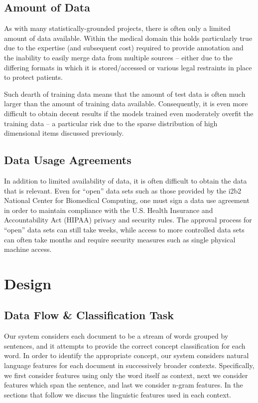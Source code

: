 \documentclass[preprint]{style}
\begin{document}
\subsection{Amount of Data}
As with many statistically-grounded projects, there is often only a limited amount of data available. Within the medical domain this holds particularly true due to the expertise (and subsequent cost) required to provide annotation and the inability to easily merge data from multiple sources -- either due to the differing formats in which it is stored/accessed or various legal restraints in place to protect patients.

Such dearth of training data means that the amount of test data is often much larger than the amount of training data available. Consequently, it is even more difficult to obtain decent results if the models trained even moderately overfit the training data -- a particular risk due to the sparse distribution of high dimensional items discussed previously.

\subsection{Data Usage Agreements}
In addition to limited availability of data, it is often difficult to obtain the data that is relevant. Even for ``open'' data sets such as those provided by the i2b2 National Center for Biomedical Computing, one must sign a data use agreement in order to maintain compliance with the U.S. Health Insurance and Accountability Act (HIPAA) privacy and security rules. The approval process for ``open'' data sets can still take weeks, while access to more controlled data sets can often take months and require security measures such as single physical machine access.

\section{Design}

\subsection{Data Flow \& Classification Task}
Our system considers each document to be a stream of words grouped by sentences, and it attempts to provide the correct concept classification for each word. In order to identify the appropriate concept, our system considers natural language features for each document in successively broader contexts. Specifically, we first consider features using only the word itself as context, next we consider features which span the sentence, and last we consider n-gram features. In the sections that follow we discuss the linguistic features used in each context.
\end{document}
